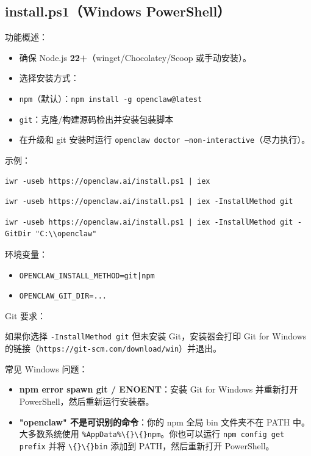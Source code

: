 \subsection{install.ps1（Windows PowerShell）}


功能概述：

\begin{itemize}
  \item 确保 Node.js \textbf{22+}（winget/Chocolatey/Scoop 或手动安装）。
  \item 选择安装方式：
  \item \texttt{npm}（默认）：\texttt{npm install -g openclaw@latest}
  \item \texttt{git}：克隆/构建源码检出并安装包装脚本
  \item 在升级和 git 安装时运行 \texttt{openclaw doctor --non-interactive}（尽力执行）。
\end{itemize}


示例：

\begin{lstlisting}
iwr -useb https://openclaw.ai/install.ps1 | iex
\end{lstlisting}


\begin{lstlisting}
iwr -useb https://openclaw.ai/install.ps1 | iex -InstallMethod git
\end{lstlisting}


\begin{lstlisting}
iwr -useb https://openclaw.ai/install.ps1 | iex -InstallMethod git -GitDir "C:\\openclaw"
\end{lstlisting}


环境变量：

\begin{itemize}
  \item \texttt{OPENCLAW\_INSTALL\_METHOD=git|npm}
  \item \texttt{OPENCLAW\_GIT\_DIR=...}
\end{itemize}


Git 要求：

如果你选择 \texttt{-InstallMethod git} 但未安装 Git，安装器会打印 Git for Windows 的链接（\texttt{https://git-scm.com/download/win}）并退出。

常见 Windows 问题：

\begin{itemize}
  \item \textbf{npm error spawn git / ENOENT}：安装 Git for Windows 并重新打开 PowerShell，然后重新运行安装器。
  \item \textbf{"openclaw" 不是可识别的命令}：你的 npm 全局 bin 文件夹不在 PATH 中。大多数系统使用 \texttt{\%AppData\%\textbackslash\{\}\textbackslash\{\}npm}。你也可以运行 \texttt{npm config get prefix} 并将 \texttt{\textbackslash\{\}\textbackslash\{\}bin} 添加到 PATH，然后重新打开 PowerShell。
\end{itemize}




